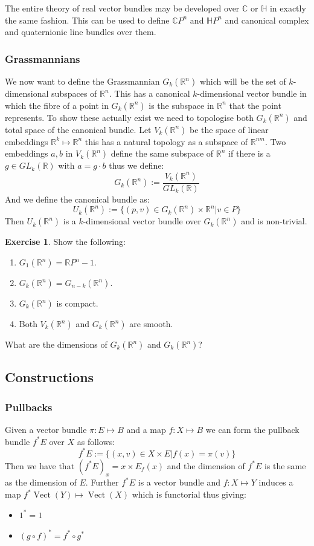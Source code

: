 \documentclass[a4paper,10pt]{article}
\theoremstyle{plain}%
\theoremstyle{definition}
\newtheorem{exer}{Exercise}
\theoremstyle{remark}
\newcommand{\RR}{\mathbb{R}}
\newcommand{\CC}{\mathbb{C}}
\newcommand{\HH}{\mathbb{H}}
\DeclareMathOperator{\Vect}{Vect}
\begin{document}
The entire theory of real vector bundles may be developed over $\CC$ or $\HH$ in exactly the same fashion. This can
be used to define $\CC P^n$ and $\HH P^n$ and canonical complex and quaternionic line bundles over them.

\subsubsection{Grassmannians}

We now want to define the Grassmannian $G_k(\RR^n)$ which will be the set of $k$-dimensional subspaces of $\RR^n$.
This has a canonical $k$-dimensional vector bundle in which the fibre of a point in $G_k(\RR^n)$ is the subspace 
in $\RR^n$ that the point represents. 
To show these actually exist we need to topologise both $G_k(\RR^n)$ and total space of the canonical bundle.
Let $V_k(\RR^n)$ be the space of linear embeddings $\RR^k\mapsto \RR^n$ this has a natural topology as a subspace of
$\RR^{n m}$. Two embeddings $a,b$ in $V_k(\RR^n)$ define the same subspace of $\RR^n$ if there is a $g\in GL_k(\RR)$
with $a=g\cdot b$ thus we define:
$$G_k(\RR^n):=\frac{V_k(\RR^n)}{GL_k(\RR)}$$
And we define the canonical bundle as:
$$U_k(\RR^n):=\{(p,v)\in G_k(\RR^n)\times \RR^n | v\in P\}$$
Then $U_k(\RR^n)$ is a $k$-dimensional vector bundle over $G_k(\RR^n)$ and is non-trivial.

\begin{exer}
Show the following:
 \begin{enumerate}
  \item $G_1(\RR^n)=\RR P^n-1$.
  \item $G_k(\RR^n) = G_{n-k}(\RR^n)$.
  \item $G_k(\RR^n)$ is compact.
  \item Both $V_k(\RR^n)$ and $G_k(\RR^n)$ are smooth.
 \end{enumerate}
What are the dimensions of $G_k(\RR^n)$ and $G_k(\RR^n)$?
\end{exer}

\subsection{Constructions}

\subsubsection{Pullbacks}

Given a vector bundle $\pi:E\mapsto B$ and a map $f:X\mapsto B$ we can form the pullback bundle
$f^\ast E$ over $X$ as follows:
$$f^\ast E := \{ (x,v) \in X\times E | f(x)=\pi(v)\}$$
Then we have that $(f^\ast E)_x=x\times E_f(x)$ and the dimension of $f^\ast E$ is the same as
the dimension of $E$. Further $f^\ast E$ is a vector bundle and $f:X\mapsto Y$ induces a map
$f^\ast \Vect(Y)\mapsto \Vect(X)$ which is functorial thus giving:
\begin{itemize}
 \item $1^\ast = 1$
 \item $(g\circ f)^\ast = f^\ast \circ g^\ast$
\end{itemize}
\end{document}
